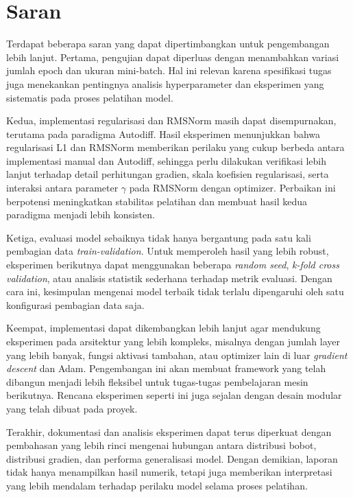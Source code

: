 \section{Saran}

Terdapat beberapa saran yang dapat dipertimbangkan untuk pengembangan lebih lanjut. Pertama, pengujian dapat diperluas dengan menambahkan variasi jumlah epoch dan ukuran mini-batch. Hal ini relevan karena spesifikasi tugas juga menekankan pentingnya analisis hyperparameter dan eksperimen yang sistematis pada proses pelatihan model.

Kedua, implementasi regularisasi dan RMSNorm masih dapat disempurnakan, terutama pada paradigma Autodiff. Hasil eksperimen menunjukkan bahwa regularisasi L1 dan RMSNorm memberikan perilaku yang cukup berbeda antara implementasi manual dan Autodiff, sehingga perlu dilakukan verifikasi lebih lanjut terhadap detail perhitungan gradien, skala koefisien regularisasi, serta interaksi antara parameter \(\gamma\) pada RMSNorm dengan optimizer. Perbaikan ini berpotensi meningkatkan stabilitas pelatihan dan membuat hasil kedua paradigma menjadi lebih konsisten.

Ketiga, evaluasi model sebaiknya tidak hanya bergantung pada satu kali pembagian data \textit{train-validation}. Untuk memperoleh hasil yang lebih robust, eksperimen berikutnya dapat menggunakan beberapa \textit{random seed}, \textit{k-fold cross validation}, atau analisis statistik sederhana terhadap metrik evaluasi. Dengan cara ini, kesimpulan mengenai model terbaik tidak terlalu dipengaruhi oleh satu konfigurasi pembagian data saja.

Keempat, implementasi dapat dikembangkan lebih lanjut agar mendukung eksperimen pada arsitektur yang lebih kompleks, misalnya dengan jumlah layer yang lebih banyak, fungsi aktivasi tambahan, atau optimizer lain di luar \textit{gradient descent} dan Adam. Pengembangan ini akan membuat framework yang telah dibangun menjadi lebih fleksibel untuk tugas-tugas pembelajaran mesin berikutnya. Rencana eksperimen seperti ini juga sejalan dengan desain modular yang telah dibuat pada proyek.

Terakhir, dokumentasi dan analisis eksperimen dapat terus diperkuat dengan pembahasan yang lebih rinci mengenai hubungan antara distribusi bobot, distribusi gradien, dan performa generalisasi model. Dengan demikian, laporan tidak hanya menampilkan hasil numerik, tetapi juga memberikan interpretasi yang lebih mendalam terhadap perilaku model selama proses pelatihan.
